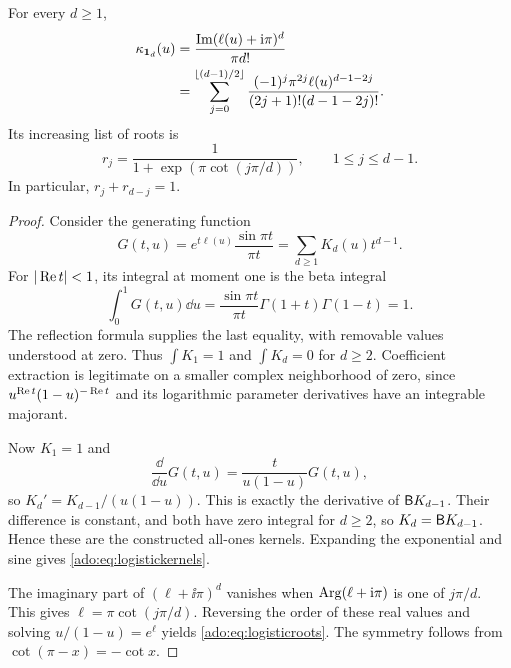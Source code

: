 \begin{theorem}
\label{ado:thm:logistickernels}
For every $d\ge1$,
\begin{align}
 \kappa_{\boldsymbol{1}_d}(u)
 &=\frac{\operatorname{Im}(\ell(u)+\mathrm i\pi)^d}{\pi d!}\notag\\
 &=\sum_{j=0}^{\lfloor(d-1)/2\rfloor}
 \frac{(-1)^j\pi^{2j}\ell(u)^{d-1-2j}}
 {(2j+1)!(d-1-2j)!}.
 \label{ado:eq:logistickernels}
\end{align}
Its increasing list of roots is
\begin{equation}\label{ado:eq:logisticroots}
 r_j=\frac1{1+\exp(\pi\cot(j\pi/d))},
 \qquad 1\le j\le d-1.
\end{equation}
In particular, $r_j+r_{d-j}=1$.
\end{theorem}
\begin{proof}
Consider the generating function
\begin{equation}\label{ado:eq:kernelgenerator}
 G(t,u)=e^{t\ell(u)}\frac{\sin\pi t}{\pi t}
       =\sum_{d\ge1}K_d(u)t^{d-1}.
\end{equation}
For $|\operatorname{Re} t|<1$, its integral at moment one is the beta integral
\[
 \int_0^1G(t,u)\dd u
 =\frac{\sin\pi t}{\pi t}\Gamma(1+t)\Gamma(1-t)=1.
\]
The reflection formula supplies the last equality, with removable values
understood at zero. Thus $\int K_1=1$ and $\int K_d=0$ for $d\ge2$.
Coefficient extraction is legitimate on a smaller complex neighborhood
of zero, since $u^{\operatorname{Re} t}(1-u)^{-\operatorname{Re} t}$ and its logarithmic
parameter derivatives have an integrable majorant.

Now $K_1=1$ and
\[
 \frac{\dd}{\dd u}G(t,u)=\frac{t}{u(1-u)}G(t,u),
\]
so $K_d'=K_{d-1}/(u(1-u))$. This is exactly the derivative of
$\mathsf B K_{d-1}$. Their difference is constant, and both have zero
integral for $d\ge2$, so $K_d=\mathsf B K_{d-1}$. Hence these are the
constructed all-ones kernels. Expanding the exponential and sine gives
\eqref{ado:eq:logistickernels}.

The imaginary part of $(\ell+\ii\pi)^d$ vanishes when
$\operatorname{Arg}(\ell+\mathrm i\pi)$ is one of $j\pi/d$. This gives
$\ell=\pi\cot(j\pi/d)$. Reversing the order of these real values
and solving $u/(1-u)=e^\ell$ yields \eqref{ado:eq:logisticroots}.
The symmetry follows from $\cot(\pi-x)=-\cot x$.
\end{proof}

